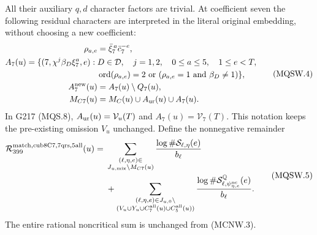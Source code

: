 All their auxiliary $q,d$ character factors are trivial.
At coefficient seven the following residual characters are interpreted
in the literal original embedding, without choosing a new coefficient:
\[
 \begin{split}
 \rho_{a,e}&=\bar\xi_7^{\,a}\bar c_7^{-e},\\
 A_7(u)=\{(7,\chi^j\beta_D\xi_7^a,e):{}&D\in\mathcal D,
       \quad j=1,2,\quad0\leq a\leq5,\quad1\leq e<T,\\
       &\operatorname{ord}(\rho_{a,e})=2\ \text{or}
                   \ (\rho_{a,e}=1\ \text{and}\ \beta_D\ne1)\},\\
 A_7^{\rm new}(u)&=A_7(u)\setminus Q_7(u),\\
 M_{C7}(u)&=M_C(u)\cup A_{\rm ur}(u)\cup A_7(u).
 \end{split}\tag{MQSW.4}
\]
In G217 (MQS.8), $A_{\rm ur}(u)=\mathcal V_u(T)$ and
$A_7(u)=\mathcal V_7(T)$. This notation keeps the pre-existing
omission $V_u$ unchanged.
Define the nonnegative remainder
\[
 \begin{split}
 \mathcal R_{399}^{\rm match,cub8C7,7qrs,5all}(u)={}&
  \sum_{\substack{(\ell,\eta,e)\in\\ J_{u,\rm mix}\setminus M_{C7}(u)}}
                    \frac{\log\#\mathcal S_{\ell,\eta}(e)}{b_\ell}\\
 &+\sum_{\substack{(\ell,\eta,e)\in J_{u,0}\setminus\\
       (V_u\cup Y_u\cup C_7^{\rm all}(u)\cup C_5^{\rm all}(u))}}
       \frac{\log\#\mathcal S^{\mathbb Q}_{\ell,
                             \psi_{\eta,e}^{\rm nc}}(e)}{b_\ell}.
 \end{split}\tag{MQSW.5}
\]
The entire rational noncritical sum is unchanged from (MCNW.3).

